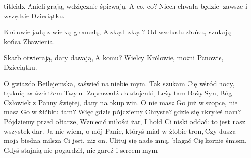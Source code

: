 \documentclass[a5paper, portrait, 12pt]{mwart}
\begin{document}
\begin{songs}{titleidx}
\beginverse
Anieli grają, wdzięcznie śpiewają,
A co, co?
\endverse
\beginchorus
Niech chwała będzie, zawsze i wszędzie
Dzieciątku.
\endchorus

\beginverse
Królowie jadą z wielką gromadą,
A skąd, zkąd?
\endverse
\beginchorus
Od wschodu słońca, szukają końca
Zbawienia.
\endchorus

\beginverse
Skarb otwierają, dary dawają,
A komu?
\endverse
\beginchorus
Wielcy Królowie, możni Panowie,
Dzieciątku.
\endchorus
\endsong

\beginverse
O gwiazdo Betlejemska,
zaświeć na niebie mym.
Tak szukam Cię wśród nocy,
tęsknię za światłem Twym.
\endverse
\beginchorus
Zaprowadź do stajenki,
Leży tam Boży Syn,
Bóg - Człowiek z Panny świętej,
dany na okup win.
\endchorus
\beginverse
O nie masz Go już w szopce,
nie masz Go w żłóbku tam?
Więc gdzie pójdziemy Chryste?
gdzie się ukryłeś nam?
\endverse
\beginchorus
Pójdziemy przed ołtarze,
Wzniecić miłości żar,
I hołd Ci niski oddać:
to jest nasz wszystek dar.
\endchorus
\beginverse
Ja nie wiem, o mój Panie,
któryś miał w żłobie tron,
Czy dusza moja biedna
milsza Ci jest, niż on.
\endverse
\beginchorus
Ulituj się nade mną, błagać Cię
kornie śmiem,
Gdyś stajnią nie pogardził,
nie gardź i sercem mym.
\endchorus
\endsong



\end{songs}
\end{document}
